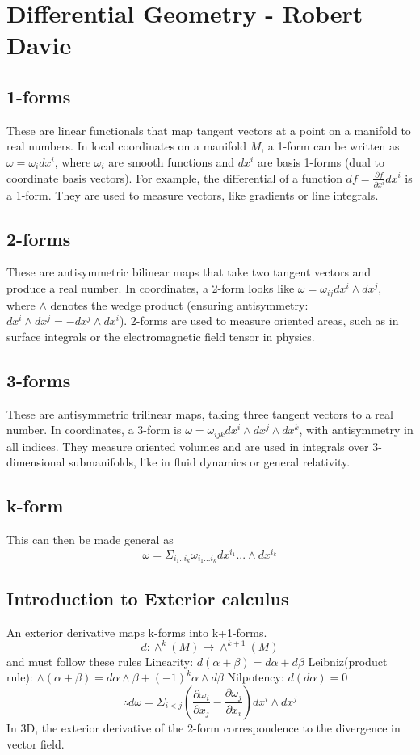 
\section{Differential Geometry - Robert Davie}
\subsection{1-forms}
These are linear functionals that map tangent vectors at a point on a manifold to real numbers. In local coordinates on a manifold $M$, a 1-form can be written as $\omega = \omega_i dx^i$, where $\omega_i$ are smooth functions and $dx^i$ are basis 1-forms (dual to coordinate basis vectors). For example, the differential of a function $df = \frac{\partial f}{\partial x^i} dx^i$ is a 1-form. They are used to measure vectors, like gradients or line integrals.
\subsection{2-forms}
These are antisymmetric bilinear maps that take two tangent vectors and produce a real number. In coordinates, a 2-form looks like $\omega = \omega_{ij} dx^i \wedge dx^j$, where $\wedge$ denotes the wedge product (ensuring antisymmetry: $dx^i \wedge dx^j = -dx^j \wedge dx^i$). 2-forms are used to measure oriented areas, such as in surface integrals or the electromagnetic field tensor in physics.
\subsection{3-forms}
These are antisymmetric trilinear maps, taking three tangent vectors to a real number. In coordinates, a 3-form is $\omega = \omega_{ijk} dx^i \wedge dx^j \wedge dx^k$, with antisymmetry in all indices. They measure oriented volumes and are used in integrals over 3-dimensional submanifolds, like in fluid dynamics or general relativity.
\subsection{k-form}
This can then be made general as
$$\omega=\Sigma_{i_1..i_k}\omega_{i_1...i_k} dx^{i_1}... \wedge dx^{i_k}$$

\subsection{Introduction to Exterior calculus}
An exterior derivative maps k-forms into k+1-forms.
$$d: \wedge^k(M) \to \wedge^{k+1}(M)$$
and must follow these rules
Linearity: $d(\alpha + \beta) =d\alpha + d\beta$
Leibniz(product rule): $\wedge(\alpha + \beta)= d\alpha \wedge \beta + (-1)^k \alpha \wedge d\beta $
Nilpotency: $d(d\alpha)=0$
$$\therefore d \omega=\Sigma_{i<j} (\frac{\partial \omega_i}{\partial x_j} - \frac{\partial \omega_j}{\partial x_i})dx^i \wedge dx^j$$
In 3D, the exterior derivative of the 2-form correspondence to the divergence in vector field.

